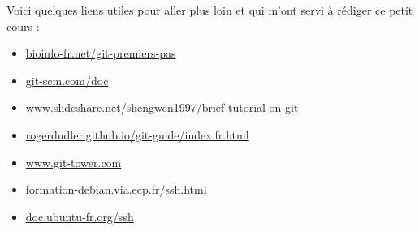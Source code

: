 \documentclass[12pt,a4paper]{article}
\begin{document}
Voici quelques liens utiles pour aller plus loin et qui m'ont servi à rédiger ce petit cours :
\begin{itemize}
\item \href{http://bioinfo-fr.net/git-premiers-pas}{bioinfo-fr.net/git-premiers-pas}
\item \href{https://git-scm.com/doc}{git-scm.com/doc}
\item \href{http://www.slideshare.net/shengwen1997/brief-tutorial-on-git}{www.slideshare.net/shengwen1997/brief-tutorial-on-git}
\item \href{http://rogerdudler.github.io/git-guide/index.fr.html}{rogerdudler.github.io/git-guide/index.fr.html}
\item \href{https://www.git-tower.com}{www.git-tower.com}
\item \href{http://formation-debian.via.ecp.fr/ssh.html}{formation-debian.via.ecp.fr/ssh.html}
\item \href{https://doc.ubuntu-fr.org/ssh}{doc.ubuntu-fr.org/ssh}
\end{itemize}

\newpage


\end{document}
